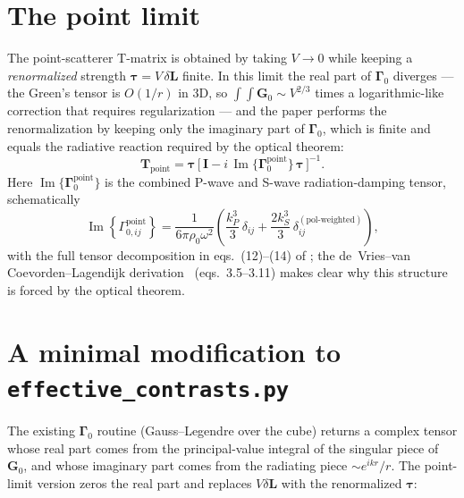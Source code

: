 \documentclass[11pt,a4paper]{article}
\newcommand{\G}{\bm{G}}
\newcommand{\T}{\bm{T}}
\newcommand{\Gam}{\bm{\Gamma}}
\newcommand{\dL}{\delta\bm{L}}
\DeclareMathOperator{\Im}{Im}
\begin{document}
\section{The point limit}

The point-scatterer T-matrix is obtained by taking $V \to 0$ while
keeping a \emph{renormalized} strength $\bm{\tau} = V\,\dL$ finite. In
this limit the real part of $\Gam_0$ diverges --- the Green's tensor
is $O(1/r)$ in 3D, so $\int\!\!\int \G_0 \sim V^{2/3}$ times a
logarithmic-like correction that requires regularization --- and the
paper performs the renormalization by keeping only the imaginary part
of $\Gam_0$, which is finite and equals the radiative reaction
required by the optical theorem:
\begin{equation}
  \T_{\text{point}} = \bm{\tau}
    \, \big[\, \bm{I} - i\,\Im\{\Gam_0^{\text{point}}\} \, \bm{\tau} \,\big]^{-1}.
  \label{eq:Tpoint}
\end{equation}
Here $\Im\{\Gam_0^{\text{point}}\}$ is the combined P-wave and S-wave
radiation-damping tensor, schematically
\begin{equation}
  \Im\!\left\{\Gamma_{0,ij}^{\text{point}}\right\}
    = \frac{1}{6\pi \rho_0 \omega^2} \left(
        \frac{k_P^3}{3}\,\delta_{ij}
      + \frac{2 k_S^3}{3}\,\delta_{ij}^{(\text{pol-weighted})}
    \right),
\end{equation}
with the full tensor decomposition in eqs.\ (12)--(14) of
\cite{LeroyChastanetDerode2010}; the de~Vries--van
Coevorden--Lagendijk derivation~\cite{deVries1998}
(eqs.\ 3.5--3.11) makes clear why this structure is forced by the
optical theorem.

\section{A minimal modification to \texttt{effective\_contrasts.py}}

The existing $\Gam_0$ routine (Gauss--Legendre over the cube) returns
a complex tensor whose real part comes from the principal-value
integral of the singular piece of $\G_0$, and whose imaginary part
comes from the radiating piece $\sim e^{ikr}/r$. The point-limit
version zeros the real part and replaces $V\dL$ with the renormalized
$\bm{\tau}$:
\end{document}
